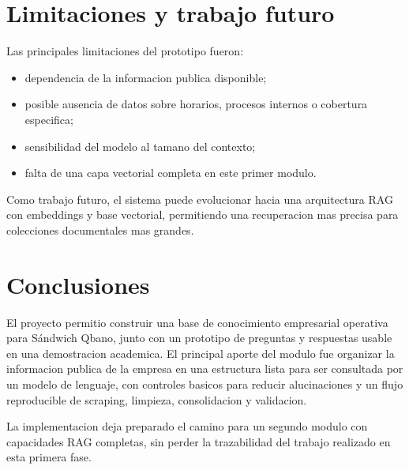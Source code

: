 \documentclass[journal]{IEEEtran}
\begin{document}
\section{Limitaciones y trabajo futuro}
Las principales limitaciones del prototipo fueron:

\begin{itemize}
\item dependencia de la informacion publica disponible;
\item posible ausencia de datos sobre horarios, procesos internos o cobertura especifica;
\item sensibilidad del modelo al tamano del contexto;
\item falta de una capa vectorial completa en este primer modulo.
\end{itemize}

Como trabajo futuro, el sistema puede evolucionar hacia una arquitectura RAG con embeddings y base vectorial, permitiendo una recuperacion mas precisa para colecciones documentales mas grandes.

\section{Conclusiones}
El proyecto permitio construir una base de conocimiento empresarial operativa para Sándwich Qbano, junto con un prototipo de preguntas y respuestas usable en una demostracion academica. El principal aporte del modulo fue organizar la informacion publica de la empresa en una estructura lista para ser consultada por un modelo de lenguaje, con controles basicos para reducir alucinaciones y un flujo reproducible de scraping, limpieza, consolidacion y validacion.

La implementacion deja preparado el camino para un segundo modulo con capacidades RAG completas, sin perder la trazabilidad del trabajo realizado en esta primera fase.



\end{document}
